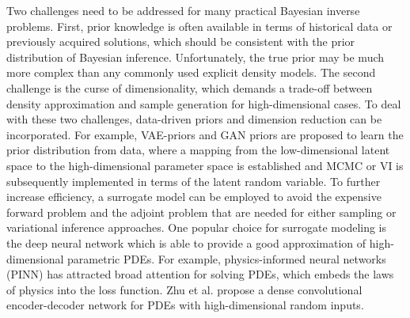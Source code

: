 Two challenges need to be addressed for many practical Bayesian inverse problems. 
First, prior knowledge is often available in terms of historical data or previously acquired solutions, which should be consistent with the prior distribution of Bayesian inference. Unfortunately, the true prior may be much more complex than any commonly used explicit density models. The second challenge is the curse of dimensionality, which demands a trade-off between density approximation and sample generation for high-dimensional cases. 
To deal with these two challenges, data-driven priors and dimension reduction can be incorporated.  For example, VAE-priors \cite{goh2022solving, xia2023vi, tewari-deeppriors-2022, xia2022bayesian,zhihang2023domain} and GAN priors \cite{patel2022solution} are proposed to learn the prior distribution from data, where a mapping from the low-dimensional latent space to the high-dimensional parameter space is established and MCMC or VI is subsequently implemented in terms of the latent random variable. To further increase efficiency, a surrogate model can be employed to avoid the expensive forward problem and the adjoint problem  \cite{tromp2005seismic,cao2003adjoint} that are needed for either sampling or variational inference approaches. One popular choice for surrogate modeling is the deep neural network which is able to provide a good approximation of high-dimensional parametric PDEs. For example, physics-informed neural networks (PINN) \cite{raissi2019physics} has attracted broad attention for solving PDEs, which embeds the laws of physics into the loss function. Zhu et al. \cite{zhu2018bayesian,zhu2019physics} propose a dense convolutional encoder-decoder network for PDEs with high-dimensional random inputs.

